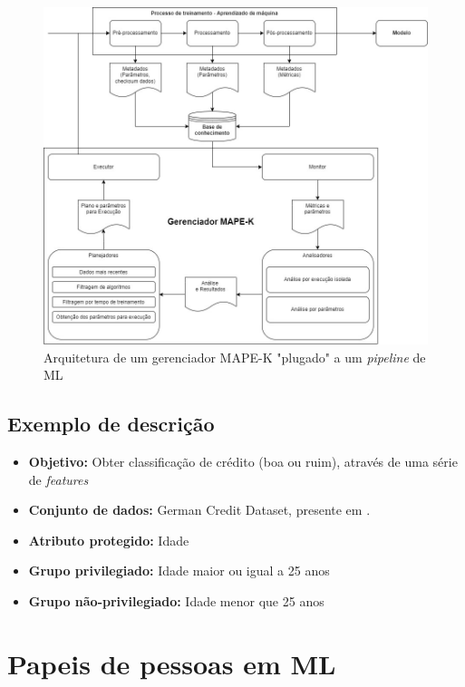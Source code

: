 \documentclass[portugues, 12pt, a4paper]{article}
\begin{document}
\begin{figure}[h]
\centering
\includegraphics[scale=0.5]{images/ML-MAPE-K.jpg}
\caption {Arquitetura de um gerenciador MAPE-K "plugado" a um \textit{pipeline} de ML}
\label{fig:AIArchitecture}
\end{figure}

\subsection{Exemplo de descrição}

\begin{itemize}
\item \textbf{Objetivo:} Obter classificação de crédito (boa ou ruim), através de uma série de \textit{features}

\item \textbf{Conjunto de dados:} German Credit Dataset, presente em \citep{ucigerman_2021}.

\item \textbf{Atributo protegido:} Idade

\item \textbf{Grupo privilegiado:} Idade maior ou igual a 25 anos

\item \textbf{Grupo não-privilegiado:} Idade menor que 25 anos

\end{itemize}

\section{Papeis de pessoas em ML}
\end{document}
